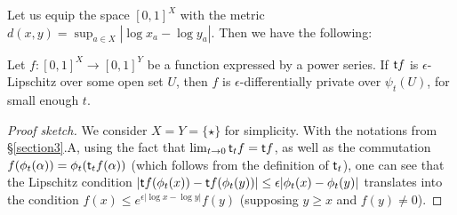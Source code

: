Let us equip the space $[0,1]^{X}$ with the metric $d(x,y)=\sup_{a\in X}|\log x_{a}-\log y_{a}|$. Then we have the following:
\begin{proposition}
Let $f: [0,1]^{X}\to [0,1]^{Y}$ be a function expressed by a power series. If $\mathsf{t} f$ is $\epsilon$-Lipschitz over some open set $U$, then $f$ is $\epsilon$-differentially private over $\psi_{t}(U)$, for small enough $t$.
\end{proposition}
\begin{proof}[Proof sketch]
We consider $X=Y=\{\star\}$ for simplicity.
With the notations from \S \ref{section3}.A, using the fact that $\lim_{t\to 0}\mathsf{t} _{t}f= \mathsf{t} f$, as well as the commutation $f(\phi_{t}(\alpha)) = \phi_{t}(\mathsf{t} _{t}f(\alpha))$ (which follows from the definition of $\mathsf{t} _{t}$), one can see that the Lipschitz condition  
$|\mathsf{t} f(\phi_{t}(x))-\mathsf{t} f(\phi_{t}(y))|\leq \epsilon |\phi_{t}(x)-\phi_{t}(y)|$ translates into the condition 
$f(x) \leq e^{\epsilon |\log x-\log y|} f(y)$ (supposing $y\geq x$ and $f(y)\neq 0$).
\end{proof}

%
%
%
%
%
%
%
%



